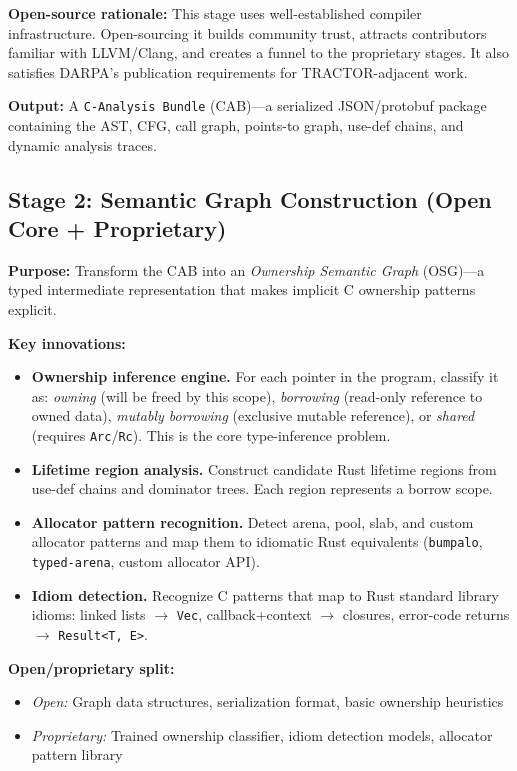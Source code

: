 \documentclass[11pt,a4paper]{article}
\theoremstyle{definition}
\theoremstyle{remark}
\begin{document}
\textbf{Open-source rationale:} This stage uses well-established compiler infrastructure. Open-sourcing it builds community trust, attracts contributors familiar with LLVM/Clang, and creates a funnel to the proprietary stages. It also satisfies DARPA's publication requirements for TRACTOR-adjacent work.

\textbf{Output:} A \texttt{C-Analysis Bundle} (CAB)---a serialized JSON/protobuf package containing the AST, CFG, call graph, points-to graph, use-def chains, and dynamic analysis traces.

\subsection{Stage 2: Semantic Graph Construction (Open Core + Proprietary)}

\textbf{Purpose:} Transform the CAB into an \textit{Ownership Semantic Graph} (OSG)---a typed intermediate representation that makes implicit C ownership patterns explicit.

\textbf{Key innovations:}
\begin{itemize}[leftmargin=2em]
\item \textbf{Ownership inference engine.} For each pointer in the program, classify it as: \textit{owning} (will be freed by this scope), \textit{borrowing} (read-only reference to owned data), \textit{mutably borrowing} (exclusive mutable reference), or \textit{shared} (requires \texttt{Arc}/\texttt{Rc}). This is the core type-inference problem.
\item \textbf{Lifetime region analysis.} Construct candidate Rust lifetime regions from use-def chains and dominator trees. Each region represents a borrow scope.
\item \textbf{Allocator pattern recognition.} Detect arena, pool, slab, and custom allocator patterns and map them to idiomatic Rust equivalents (\texttt{bumpalo}, \texttt{typed-arena}, custom allocator API).
\item \textbf{Idiom detection.} Recognize C patterns that map to Rust standard library idioms: linked lists $\to$ \texttt{Vec}, callback+context $\to$ closures, error-code returns $\to$ \texttt{Result<T, E>}.
\end{itemize}

\textbf{Open/proprietary split:}
\begin{itemize}[leftmargin=2em]
\item \textit{Open:} Graph data structures, serialization format, basic ownership heuristics
\item \textit{Proprietary:} Trained ownership classifier, idiom detection models, allocator pattern library
\end{itemize}
\end{document}

